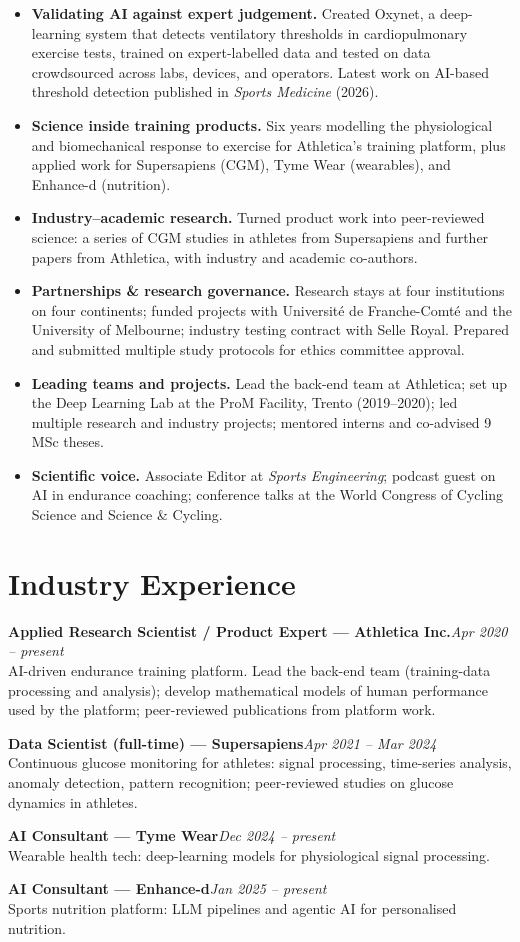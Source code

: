 \documentclass[10pt,a4paper]{article}
\newcommand{\entry}[3]{%
  \textbf{#2}\hfill\textit{\small#1}\\[1pt]
  \small#3\par\vspace{5pt}%
}
\begin{document}
\begin{itemize}
  \item \textbf{Validating AI against expert judgement.} Created Oxynet, a deep-learning system that detects ventilatory thresholds in cardiopulmonary exercise tests, trained on expert-labelled data and tested on data crowdsourced across labs, devices, and operators. Latest work on AI-based threshold detection published in \textit{Sports Medicine} (2026).
  \item \textbf{Science inside training products.} Six years modelling the physiological and biomechanical response to exercise for Athletica's training platform, plus applied work for Supersapiens (CGM), Tyme Wear (wearables), and Enhance-d (nutrition).
  \item \textbf{Industry--academic research.} Turned product work into peer-reviewed science: a series of CGM studies in athletes from Supersapiens and further papers from Athletica, with industry and academic co-authors.
  \item \textbf{Partnerships \& research governance.} Research stays at four institutions on four continents; funded projects with Université de Franche-Comté and the University of Melbourne; industry testing contract with Selle Royal. Prepared and submitted multiple study protocols for ethics committee approval.
  \item \textbf{Leading teams and projects.} Lead the back-end team at Athletica; set up the Deep Learning Lab at the ProM Facility, Trento (2019--2020); led multiple research and industry projects; mentored interns and co-advised 9 MSc theses.
  \item \textbf{Scientific voice.} Associate Editor at \textit{Sports Engineering}; podcast guest on AI in endurance coaching; conference talks at the World Congress of Cycling Science and Science \& Cycling.
\end{itemize}

\section{Industry Experience}

\entry{Apr 2020 – present}{Applied Research Scientist / Product Expert — Athletica Inc.}{AI-driven endurance training platform. Lead the back-end team (training-data processing and analysis); develop mathematical models of human performance used by the platform; peer-reviewed publications from platform work.}
\entry{Apr 2021 – Mar 2024}{Data Scientist (full-time) — Supersapiens}{Continuous glucose monitoring for athletes: signal processing, time-series analysis, anomaly detection, pattern recognition; peer-reviewed studies on glucose dynamics in athletes.}
\entry{Dec 2024 – present}{AI Consultant — Tyme Wear}{Wearable health tech: deep-learning models for physiological signal processing.}
\entry{Jan 2025 – present}{AI Consultant — Enhance-d}{Sports nutrition platform: LLM pipelines and agentic AI for personalised nutrition.}
\end{document}

